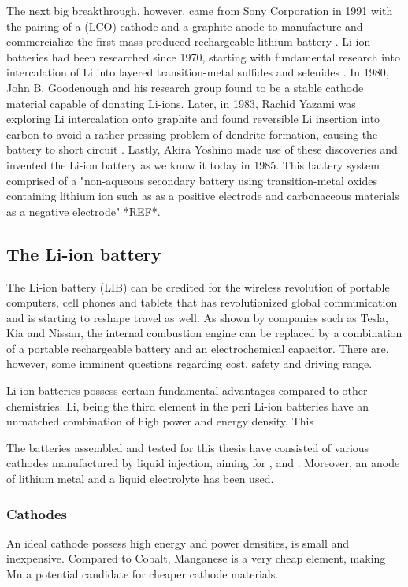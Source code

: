 \documentclass[Main/main.tex]{subfiles}
\begin{document}
The next big breakthrough, however, came from Sony Corporation in 1991 with the pairing of a  (LCO) cathode and a graphite anode to manufacture and commercialize the first mass-produced rechargeable lithium battery \cite{1_hist}. Li-ion batteries had been researched since 1970, starting with fundamental research into intercalation of Li into layered transition-metal sulfides and selenides \cite{Goodenough2013}.
In 1980, John B. Goodenough and his research group found  to be a stable cathode material capable of donating Li-ions. Later, in 1983, Rachid Yazami was exploring Li intercalation onto graphite and found reversible Li insertion into carbon to avoid a rather pressing problem of dendrite formation, causing the battery to short circuit \cite{1_yazami}. Lastly, Akira Yoshino made use of these discoveries and invented the Li-ion battery as we know it today in 1985. This battery system comprised of a "non-aqueous secondary battery using transition-metal oxides containing lithium ion such as  as a positive electrode and carbonaceous materials as a negative electrode" *REF*. 


\subsection{The Li-ion battery}

The Li-ion battery (LIB) can be credited for the wireless revolution of portable computers, cell phones and tablets that has revolutionized global communication and is starting to reshape travel as well. As shown by companies such as Tesla, Kia and Nissan, the internal combustion engine can be replaced by a combination of a portable rechargeable battery and an electrochemical capacitor.
There are, however, some imminent questions regarding cost, safety and driving range.  

Li-ion batteries possess certain fundamental advantages compared to other chemistries. Li, being the third element in the peri
Li-ion batteries have an unmatched combination of high power and energy density. This

The batteries assembled and tested for this thesis have consisted of various cathodes manufactured by liquid injection, aiming for ,  and . Moreover, an anode of lithium metal and a liquid electrolyte has been used. 

\subsubsection{Cathodes}
An ideal cathode possess high energy and power densities, is small and inexpensive. Compared to Cobalt, Manganese is a very cheap element, making Mn a potential candidate for cheaper cathode materials. 
\end{document}
